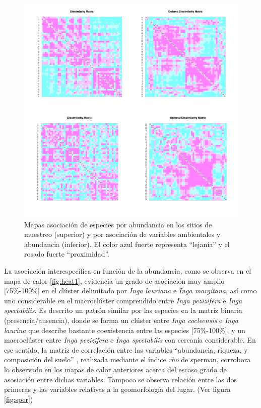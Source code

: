 \documentclass[11pt,]{article}
\begin{document}
\begin{figure}
\centering
\includegraphics[width=1.00000\textwidth]{Analisis/Imagenes manuscrito/Heat_maps_Q.png}
\caption{Mapas asociación de especies por abundancia en los sitios de
muestreo (superior) y por asociación de variables ambientales y
abundancia (inferior). El color azul fuerte representa ``lejanía'' y el
rosado fuerte ``proximidad''.\label{fig:heat}}
\end{figure}

La asociación interespecífica en función de la abundancia, como se
observa en el mapa de calor \ref{fig:heat1}, evidencia un grado de
asociación muy amplio {[}75\%-100\%{]} en el clúster delimitado por
\emph{Inga lauriana} e \emph{Inga margitana}, así como uno considerable
en el macroclúster comprendido entre \emph{Inga pezizifera} e \emph{Inga
spectabilis}. Es descrito un patrón similar por las especies en la
matriz binaria (presencia/ausencia), donde se forma un clúster entre
\emph{Inga cocleensis} e \emph{Inga laurina} que describe bastante
coexistencia entre las especies {[}75\%-100\%{]}, y un macroclúster
entre \emph{Inga pezizifera} e \emph{Inga spectabilis} con cercanía
considerable. En ese sentido, la matriz de correlación entre las
variables ``abundancia, riqueza, y composición del suelo'' , realizada
mediante el índice \emph{rho} de sperman, corrobora lo observado en los
mapas de calor anteriores acerca del escaso grado de asosiación entre
dichas variables. Tampoco se observa relación entre las dos primeras y
las variables relativas a la geomorfología del lugar. (Ver figura
\ref{fig:sper})
\end{document}

